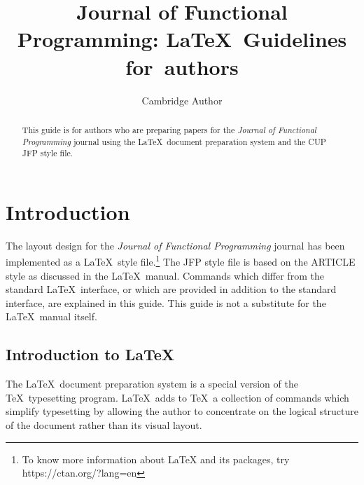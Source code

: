 \documentclass{jfp}
\begin{document}


\totalpg{\pageref{lastpage01}}

\title{Journal of Functional Programming: \LaTeX\ Guidelines for~authors}

\begin{authgrp}
\author{Cambridge Author}
\end{authgrp}


\begin{abstract}
This guide is for authors who are preparing papers for the {\em Journal of Functional Programming} journal using the \LaTeX\ document preparation
system and the CUP JFP style file.
\end{abstract}

\maketitle[F]

\section{Introduction}

The layout design for the {\em Journal of Functional Programming} journal
has been implemented as a LaTeX\ style file.\footnote{To know more information about LaTeX and its packages, try https://ctan.org/?lang=en} The JFP style file is based
on the ARTICLE style as discussed in the LaTeX\ manual. Commands which
differ from the standard LaTeX\ interface, or which are provided in addition
to the standard interface, are explained in this guide. This guide is not a
substitute for the LaTeX\ manual itself.

\subsection{Introduction to LaTeX}

The LaTeX\ document preparation system is a special version of the
TeX\ typesetting program. LaTeX\ adds to TeX\ a collection of
commands which simplify typesetting by allowing the author to
concentrate on the logical structure of the document rather than
its visual layout.
\end{document}
